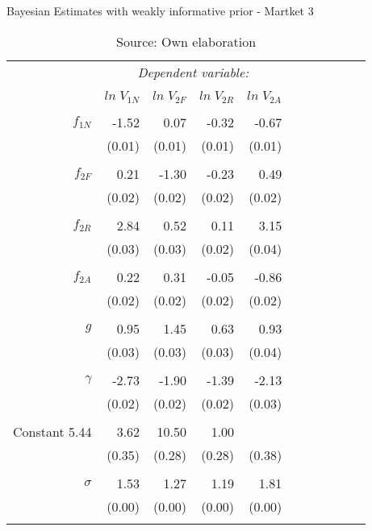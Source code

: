 \begin{table}[ht]
\caption{Bayesian Estimates with weakly informative prior - Martket 3}
\centering
\begin{tabular}{rrrrrrrrrrr}
  \toprule 
 & \multicolumn{4}{c}{\textit{Dependent variable:}} \\ 
\cline{2-5} 
\\[-1.8ex] & $ln \; V_{1N}$ & $ln \; V_{2F}$ & $ln \; V_{2R}$ & $ln \; V_{2A}$ \\ 
\hline \\[-1.8ex] 
  $f_{1N}$ & -1.52 & 0.07 & -0.32 & -0.67 \\
           & (0.01) & (0.01) & (0.01)& (0.01) \\
& & \\
  $f_{2F}$ & 0.21 & -1.30 & -0.23 & 0.49\\
  		     & (0.02)  & (0.02) & (0.02) & (0.02)\\
& & \\
  $f_{2R}$ & 2.84 & 0.52 & 0.11 & 3.15 \\
  			   & (0.03) & (0.03) & (0.02) & (0.04) \\
& & \\  
  $f_{2A}$ & 0.22 & 0.31 & -0.05 & -0.86\\
           & (0.02)  &(0.02) & (0.02) &(0.02) \\
& & \\
  $g$ & 0.95 &  1.45 & 0.63 & 0.93\\
  		& (0.03) & (0.03) & (0.03) & (0.04) \\
& & \\
  $\gamma$ & -2.73 & -1.90 & -1.39 & -2.13  \\
  			& (0.02) & (0.02) & (0.02) & (0.03) \\
& & \\  
  Constant 5.44 & 3.62 & 10.50 & 1.00  \\
  			& (0.35) & (0.28) & (0.28) & (0.38) \\
& & \\  
  \hline
  $\sigma$ & 1.53 & 1.27 & 1.19 & 1.81 \\
  		 & (0.00) & (0.00) & (0.00) & (0.00)  \\
& & \\
\bottomrule
\end{tabular}
\caption*{Source: Own elaboration}
\end{table}
